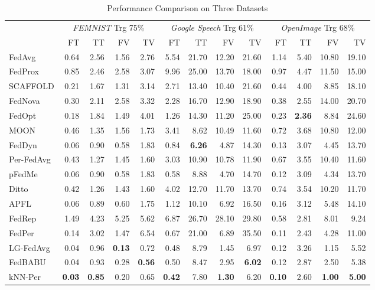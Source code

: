 
\begin{table}[t]
\centering
\caption{Performance Comparison on Three Datasets}
\label{tab:main-result}
\footnotesize

\begin{tabular}{l|rrrr|rrrr|rrrr|}
\toprule
 & \multicolumn{4}{c}{\textit{FEMNIST} Trg 75\%} & \multicolumn{4}{c}{\textit{Google Speech} Trg 61\%} & \multicolumn{4}{c}{\textit{OpenImage} Trg 68\%} \\
\cmidrule(lr){2-5} \cmidrule(lr){6-9} \cmidrule(lr){10-13}
 & FT & TT & FV & TV & FT & TT & FV & TV & FT & TT & FV & TV \\
\cmidrule(lr){2-5} \cmidrule(lr){6-9} \cmidrule(lr){10-13}
FedAvg & 0.64 & 2.56 & 1.56 & 2.76 & 5.54 & 21.70 & 12.20 & 21.60 & 1.14 & 5.40 & 10.80 & 19.10 \\
FedProx & 0.85 & 2.46 & 2.58 & 3.07 & 9.96 & 25.00 & 13.70 & 18.00 & 0.97 & 4.47 & 11.50 & 15.00 \\
SCAFFOLD & 0.21 & 1.67 & 1.31 & 3.14 & 2.71 & 13.40 & 10.40 & 21.60 & 0.44 & 4.00 & 8.85 & 18.10 \\
FedNova & 0.30 & 2.11 & 2.58 & 3.32 & 2.28 & 16.70 & 12.90 & 18.90 & 0.38 & 2.55 & 14.00 & 20.70 \\
FedOpt & 0.18 & 1.84 & 1.49 & 4.01 & 1.26 & 14.30 & 11.20 & 25.00 & 0.23 & \textbf{2.36} & 8.84 & 24.60 \\
MOON & 0.46 & 1.35 & 1.56 & 1.73 & 3.41 & 8.62 & 10.49 & 11.60 & 0.72 & 3.68 & 10.80 & 12.00 \\
FedDyn & 0.06 & 0.90 & 0.58 & 1.83 & 0.84 & \textbf{6.26} & 4.87 & 14.30 & 0.13 & 3.07 & 4.45 & 13.70 \\
Per-FedAvg & 0.43 & 1.27 & 1.45 & 1.60 & 3.03 & 10.90 & 10.78 & 11.90 & 0.67 & 3.55 & 10.40 & 11.60 \\
pFedMe & 0.06 & 0.90 & 0.58 & 1.83 & 0.58 & 8.88 & 4.70 & 14.70 & 0.12 & 3.09 & 4.34 & 13.70 \\
Ditto & 0.42 & 1.26 & 1.43 & 1.60 & 4.02 & 12.70 & 11.70 & 13.70 & 0.74 & 3.54 & 10.20 & 11.70 \\
APFL & 0.06 & 0.89 & 0.60 & 1.75 & 1.12 & 10.10 & 6.92 & 16.50 & 0.16 & 3.12 & 5.48 & 14.10 \\
FedRep & 1.49 & 4.23 & 5.25 & 5.62 & 6.87 & 26.70 & 28.10 & 29.80 & 0.58 & 2.81 & 8.01 & 9.24 \\
FedPer & 0.14 & 3.02 & 1.47 & 6.54 & 0.67 & 21.00 & 6.89 & 35.50 & 0.11 & 2.43 & 4.28 & 11.00 \\
LG-FedAvg & 0.04 & 0.96 & \textbf{0.13} & 0.72 & 0.48 & 8.79 & 1.45 & 6.97 & 0.12 & 3.26 & 1.15 & 5.52 \\
FedBABU & 0.04 & 0.93 & 0.28 & \textbf{0.56} & 0.50 & 8.47 & 2.95 & \textbf{6.02} & 0.12 & 2.87 & 2.50 & 5.38 \\
kNN-Per & \textbf{0.03} & \textbf{0.85} & 0.20 & 0.65 & \textbf{0.42} & 7.80 & \textbf{1.30} & 6.20 & \textbf{0.10} & 2.60 & \textbf{1.00} & \textbf{5.00} \\
\bottomrule
\end{tabular}
\end{table}